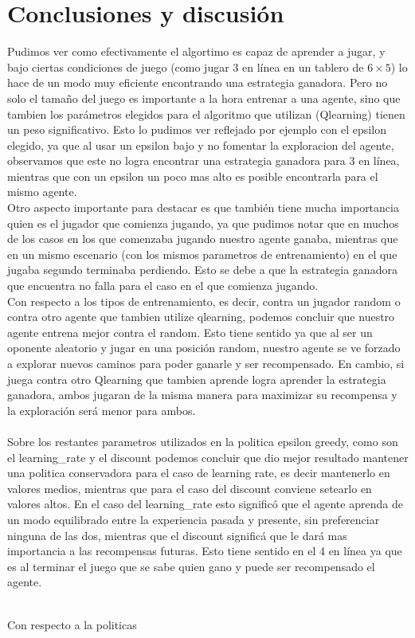 \newpage
\section{Conclusiones y discusión}

Pudimos ver como efectivamente el algortimo es capaz de aprender a jugar, y bajo ciertas condiciones de juego (como jugar 3 en línea en un tablero de $6\times5$) lo hace de un modo muy eficiente encontrando una estrategia ganadora.
Pero no solo el tamaño del juego es importante a la hora entrenar a una agente, sino que tambien los parámetros elegidos para el algoritmo que utilizan (Qlearning) tienen un peso significativo. Esto lo pudimos ver reflejado por ejemplo con el epsilon elegido, ya que al usar un epsilon bajo y no fomentar la exploracion del agente, observamos que este no logra encontrar una estrategia ganadora para 3 en línea, mientras que con un epsilon un poco mas alto es posible encontrarla para el mismo agente. \\

Otro aspecto importante para destacar es que también tiene mucha importancia quien es el jugador que comienza jugando, ya que pudimos notar que en muchos de los casos en los que comenzaba jugando nuestro agente ganaba, mientras que en un mismo escenario (con los mismos parametros de entrenamiento) en el que jugaba segundo terminaba perdiendo. Esto se debe a que la estrategia ganadora que encuentra no falla para el caso en el que comienza jugando. \\

Con respecto a los tipos de entrenamiento, es decir, contra un jugador random o contra otro agente que tambien utilize qlearning, podemos concluir que nuestro agente entrena mejor contra el random. Esto tiene sentido ya que al ser un oponente aleatorio y jugar en una posición random, nuestro agente se ve forzado a explorar nuevos caminos para poder ganarle y ser recompensado. En cambio, si juega contra otro Qlearning que tambien aprende logra aprender la estrategia ganadora, ambos jugaran de la misma manera para maximizar su recompensa y la exploración será menor para ambos.\\


\\
Sobre los restantes parametros utilizados en la politica epsilon greedy, como son el learning\_rate y el discount podemos concluir que dio mejor resultado mantener una politica conservadora para el caso de learning rate, es decir mantenerlo en valores medios, mientras que para el caso del discount conviene setearlo en valores altos. En el caso del learning\_rate esto significó que el agente aprenda de un modo equilibrado entre la experiencia pasada y presente, sin preferenciar ninguna de las dos, mientras que el discount significá que le dará mas importancia a las recompensas futuras. Esto tiene sentido en el 4 en línea ya que es al terminar el juego que se sabe quien gano y puede ser recompensado el agente.

\\
Con respecto a la politicas
